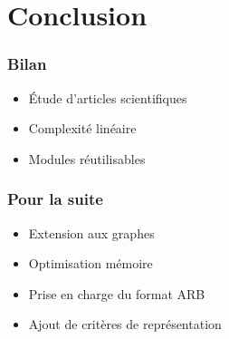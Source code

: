 \section{Conclusion}

\begin{frame}
	\frametitle{Bilan}
	\begin{itemize}
		\item Étude d'articles scientifiques
		\item Complexité linéaire
		\item Modules réutilisables
	\end{itemize}
\end{frame}

\begin{frame}
	\frametitle{Pour la suite}
	\begin{itemize}
		\item Extension aux graphes
		\item Optimisation mémoire
		\item Prise en charge du format ARB
		\item Ajout de critères de représentation %
	\end{itemize}
\end{frame}

